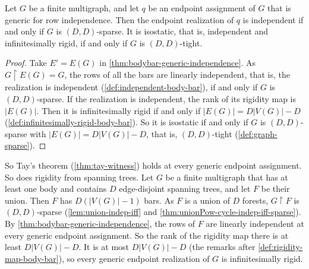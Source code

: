 \begin{corollary}
  \label{cor:bodybar-generic-tay}
  \leanok
  Let $G$ be a finite multigraph, and let $q$ be an endpoint
  assignment of $G$ that is generic for row independence. Then the
  endpoint realization of $q$ is independent if and only if $G$ is
  $(D, D)$-sparse. It is isostatic, that is, independent and
  infinitesimally rigid, if and only if $G$ is $(D, D)$-tight.
\end{corollary}
\begin{proof}
  \leanok
  Take $E' = E(G)$ in \cref{thm:bodybar-generic-independence}. As
  $G \restriction E(G) = G$, the rows of all the bars are linearly
  independent, that is, the realization is independent
  (\cref{def:independent-body-bar}), if and only if $G$ is
  $(D, D)$-sparse. If the realization is independent, the rank of its
  rigidity map is $|E(G)|$. Then it is infinitesimally rigid if and
  only if $|E(G)| = D|V(G)| - D$
  (\cref{def:infinitesimally-rigid-body-bar}). So it is isostatic if
  and only if $G$ is $(D, D)$-sparse with $|E(G)| = D|V(G)| - D$, that
  is, $(D, D)$-tight (\cref{def:graph-sparse}).
\end{proof}

So Tay's theorem (\cref{thm:tay-witness}) holds at every generic
endpoint assignment. So does rigidity from spanning trees. Let $G$ be
a finite multigraph that has at least one body and contains $D$
edge-disjoint spanning trees, and let $F$ be their union. Then $F$ has
$D(|V(G)| - 1)$ bars. As $F$ is a union of $D$ forests,
$G \restriction F$ is $(D, D)$-sparse (\cref{lem:union-indep-iff} and
\cref{thm:unionPow-cycle-indep-iff-sparse}). By
\cref{thm:bodybar-generic-independence}, the rows of $F$ are linearly
independent at every generic endpoint assignment. So the rank of the
rigidity map there is at least $D|V(G)| - D$. It is at most
$D|V(G)| - D$ (the remarks after \cref{def:rigidity-map-body-bar}), so
every generic endpoint realization of $G$ is infinitesimally rigid.

